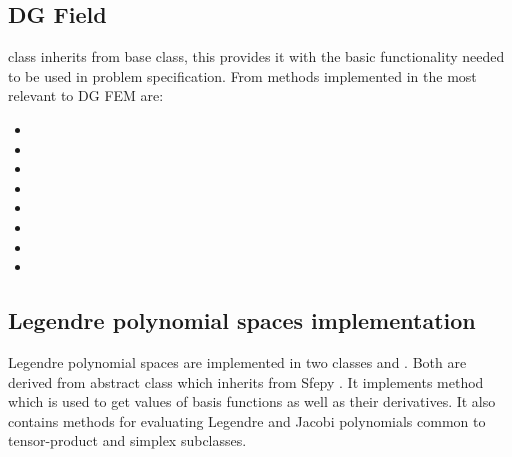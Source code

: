 \subsection{DG Field}
 class inherits from  base class, this provides it with the basic functionality needed
to be used in problem specification. From methods implemented in  the most relevant to DG FEM are:
\begin{itemize}
	\item {}
	\item {}
	\item {}
	\item {}
	\item {}
	\item {}
	\item {}
	\item {}
\end{itemize}

\subsection{Legendre polynomial spaces implementation}
Legendre polynomial spaces are implemented in two classes 
 and 
. Both are derived from abstract class 
 which inherits from Sfepy 
. It implements method  which is used to 
get values of basis functions as well as their derivatives. It also contains 
methods for evaluating Legendre and Jacobi polynomials common to tensor-product 
and simplex subclasses.



